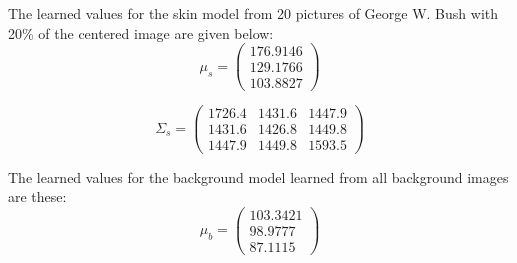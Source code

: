\documentclass[conference]{IEEEtran}
\begin{document}
\begin{compactenum}[a)]
\item The learned values for the skin model from 20 pictures of George W. Bush with 20\% of the centered image are given below:
$$
\mu_s =
 \begin{pmatrix}
  176.9146 \\
  129.1766 \\
  103.8827
 \end{pmatrix}
$$

$$
\Sigma_s =
 \begin{pmatrix}
    1726.4  &  1431.6  &  1447.9 \\
    1431.6  &  1426.8  &  1449.8 \\
    1447.9  &  1449.8  &  1593.5
 \end{pmatrix}
$$

\item The learned values for the background model learned from all background images are these:
$$
\mu_b =
 \begin{pmatrix}
  103.3421 \\
   98.9777 \\
   87.1115
 \end{pmatrix}
$$


\end{compactenum}
\end{document}
